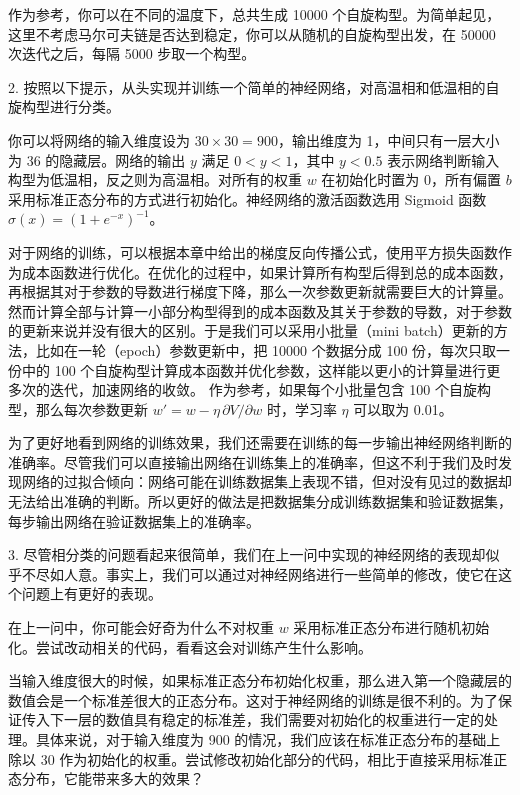 \begin{exerciseBox}[大作业（续）]
作为参考，你可以在不同的温度下，总共生成 10000 个自旋构型。为简单起见，这里不考虑马尔可夫链是否达到稳定，你可以从随机的自旋构型出发，在 50000 次迭代之后，每隔 5000 步取一个构型。

2. 按照以下提示，从头实现并训练一个简单的神经网络，对高温相和低温相的自旋构型进行分类。

你可以将网络的输入维度设为 $30\times30=900$，输出维度为 1，中间只有一层大小为 36 的隐藏层。网络的输出 $y$ 满足 $0<y<1$，其中 $y<0.5$ 表示网络判断输入构型为低温相，反之则为高温相。对所有的权重 $w$ 在初始化时置为 0，所有偏置 $b$ 采用标准正态分布的方式进行初始化。神经网络的激活函数选用 Sigmoid 函数 $\sigma(x)=(1+e^{-x})^{-1}$。

对于网络的训练，可以根据本章中给出的梯度反向传播公式，使用平方损失函数作为成本函数进行优化。在优化的过程中，如果计算所有构型后得到总的成本函数，再根据其对于参数的导数进行梯度下降，那么一次参数更新就需要巨大的计算量。然而计算全部与计算一小部分构型得到的成本函数及其关于参数的导数，对于参数的更新来说并没有很大的区别。于是我们可以采用小批量（mini batch）更新的方法，比如在一轮（epoch）参数更新中，把 10000 个数据分成 100 份，每次只取一份中的 100 个自旋构型计算成本函数并优化参数，这样能以更小的计算量进行更多次的迭代，加速网络的收敛。
作为参考，如果每个小批量包含 100 个自旋构型，那么每次参数更新 $w'=w-\eta\,\partial V/\partial w$ 时，学习率 $\eta$ 可以取为 0.01。

为了更好地看到网络的训练效果，我们还需要在训练的每一步输出神经网络判断的准确率。尽管我们可以直接输出网络在训练集上的准确率，但这不利于我们及时发现网络的过拟合倾向：网络可能在训练数据集上表现不错，但对没有见过的数据却无法给出准确的判断。所以更好的做法是把数据集分成训练数据集和验证数据集，每步输出网络在验证数据集上的准确率。

3. 尽管相分类的问题看起来很简单，我们在上一问中实现的神经网络的表现却似乎不尽如人意。事实上，我们可以通过对神经网络进行一些简单的修改，使它在这个问题上有更好的表现。

在上一问中，你可能会好奇为什么不对权重 $w$ 采用标准正态分布进行随机初始化。尝试改动相关的代码，看看这会对训练产生什么影响。

当输入维度很大的时候，如果标准正态分布初始化权重，那么进入第一个隐藏层的数值会是一个标准差很大的正态分布。这对于神经网络的训练是很不利的。为了保证传入下一层的数值具有稳定的标准差，我们需要对初始化的权重进行一定的处理。具体来说，对于输入维度为 900 的情况，我们应该在标准正态分布的基础上除以 30 作为初始化的权重。尝试修改初始化部分的代码，相比于直接采用标准正态分布，它能带来多大的效果？
\end{exerciseBox}

